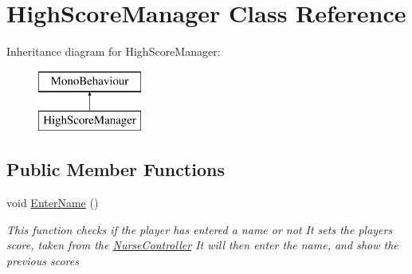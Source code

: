 \hypertarget{class_high_score_manager}{}\section{High\+Score\+Manager Class Reference}
\label{class_high_score_manager}
Inheritance diagram for High\+Score\+Manager\+:\begin{figure}[H]
\begin{center}
\leavevmode
\includegraphics[height=2.000000cm]{class_high_score_manager}
\end{center}
\end{figure}
\subsection*{Public Member Functions}
\begin{DoxyCompactItemize}
\item 
void \mbox{\hyperlink{class_high_score_manager_a098d1e52bc63ab8c014fa1210d04481e}{Enter\+Name}} ()
\begin{DoxyCompactList}\small\item\em This function checks if the player has entered a name or not It sets the player\textquotesingle{}s score, taken from the \mbox{\hyperlink{class_nurse_controller}{Nurse\+Controller}} It will then enter the name, and show the previous scores \end{DoxyCompactList}\end{DoxyCompactItemize}
